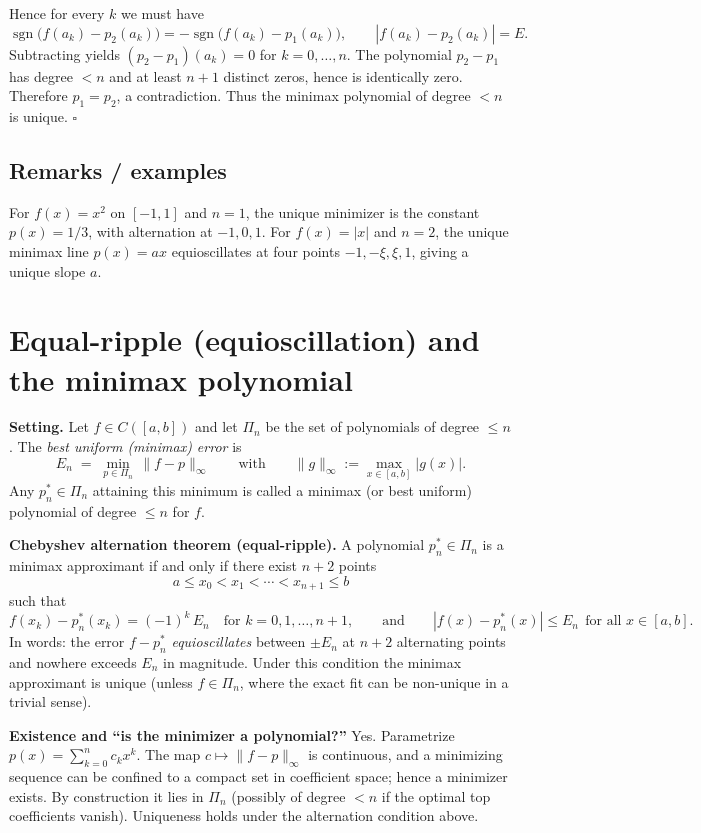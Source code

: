 \documentclass[12pt,a4paper]{article}
\newcommand{\qed}{\hfill$\square$}
\theoremstyle{plain}
\theoremstyle{definition}
\theoremstyle{remark}
\theoremstyle{remark}
\begin{document}
Hence for every $k$ we must have
\[
\operatorname{sgn}\!\bigl(f(a_k)-p_2(a_k)\bigr)=-\operatorname{sgn}\!\bigl(f(a_k)-p_1(a_k)\bigr),
\qquad |f(a_k)-p_2(a_k)|=E .
\]
Subtracting yields $(p_2-p_1)(a_k)=0$ for $k=0,\dots,n$. The polynomial $p_2-p_1$ has degree $<n$
and at least $n+1$ distinct zeros, hence is identically zero. Therefore $p_1=p_2$, a contradiction.
Thus the minimax polynomial of degree $<n$ is unique. \qed

\bigskip

\subsection*{Remarks / examples}

For $f(x)=x^2$ on $[-1,1]$ and $n=1$, the unique minimizer is the constant $p(x)=1/3$,
with alternation at $-1,0,1$. For $f(x)=|x|$ and $n=2$, the unique minimax line $p(x)=ax$
equioscillates at four points $-1,-\xi,\xi,1$, giving a unique slope $a$.
	
\section*{Equal-ripple (equioscillation) and the minimax polynomial}

\noindent\textbf{Setting.}
Let $f\in C([a,b])$ and let $\Pi_n$ be the set of polynomials of degree $\le n$.
The \emph{best uniform (minimax) error} is
\[
E_n \;=\; \min_{p\in\Pi_n}\,\|f-p\|_\infty
\qquad\text{with}\qquad
\|g\|_\infty:=\max_{x\in[a,b]}|g(x)|.
\]
Any $p_n^{*}\in\Pi_n$ attaining this minimum is called a minimax (or best uniform) polynomial of degree $\le n$ for $f$.

\medskip
\noindent\textbf{Chebyshev alternation theorem (equal-ripple).}
A polynomial $p_n^{*}\in\Pi_n$ is a minimax approximant if and only if there exist $n+2$ points
\[
a\le x_0 < x_1 < \cdots < x_{n+1} \le b
\]
such that
\[
f(x_k)-p_n^{*}(x_k)=(-1)^k\,E_n\quad\text{for }k=0,1,\dots,n+1,
\qquad\text{and}\qquad
|f(x)-p_n^{*}(x)|\le E_n\ \ \text{for all }x\in[a,b].
\]
In words: the error $f-p_n^{*}$ \emph{equioscillates} between $\pm E_n$ at $n+2$ alternating points and nowhere exceeds $E_n$ in magnitude. Under this condition the minimax approximant is unique (unless $f\in\Pi_n$, where the exact fit can be non-unique in a trivial sense).

\medskip
\noindent\textbf{Existence and ``is the minimizer a polynomial?''}
Yes. Parametrize $p(x)=\sum_{k=0}^n c_k x^k$. The map $c\mapsto \|f-p\|_\infty$ is continuous, and a minimizing sequence can be confined to a compact set in coefficient space; hence a minimizer exists. By construction it lies in $\Pi_n$ (possibly of degree $<n$ if the optimal top coefficients vanish). Uniqueness holds under the alternation condition above.
\end{document}
